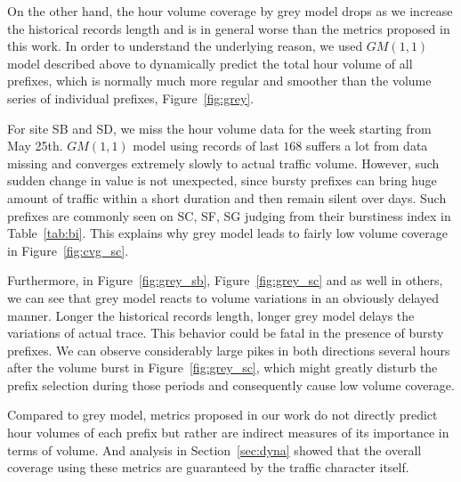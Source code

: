 On the other hand, the hour volume coverage by grey model drops as we increase the historical records length and is in general worse than the metrics proposed in this work. 
In order to understand the underlying reason, we used $GM(1,1)$ model described above to dynamically predict the total hour volume of all prefixes, which is normally much more regular and smoother than the volume series of individual prefixes, Figure~\ref{fig:grey}.

For site SB and SD, we miss the hour volume data for the week starting from May 25th. 
$GM(1,1)$ model using records of last $168$ suffers a lot from  data missing and converges extremely slowly to actual traffic volume. 
However, such sudden change in value is not unexpected, since bursty prefixes can bring huge amount of traffic within a short duration and then remain silent over days. Such prefixes are commonly seen on SC, SF, SG judging from their burstiness index in Table~\ref{tab:bi}.
This explains why grey model leads to fairly low volume coverage in Figure~\ref{fig:cvg_sc}. 

Furthermore, in Figure~\ref{fig:grey_sb}, Figure~\ref{fig:grey_sc} and as well in others, we can see that grey model reacts to volume variations in an obviously delayed manner. 
Longer the historical records length, longer grey model delays the variations of actual trace.  
This behavior could be fatal in the presence of bursty prefixes.
We can observe considerably large pikes in both directions several hours after the volume burst in Figure~\ref{fig:grey_sc}, which might greatly disturb the prefix selection during those periods and consequently cause low volume coverage.

Compared to grey model, metrics proposed in our work do not directly predict hour volumes of each prefix but rather are indirect measures of its importance in terms of volume. And analysis in Section~\ref{sec:dyna} showed that the overall coverage using these metrics are guaranteed by the traffic character itself.

